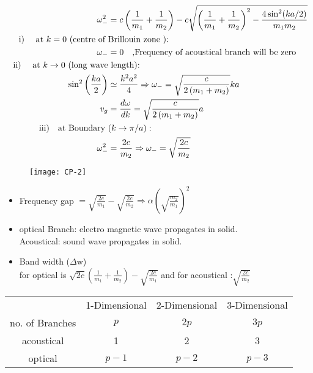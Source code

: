 \begin{align*}
\omega_{-}^{2}&=c\left(\frac{1}{m_{1}}+\frac{1}{m_{2}}\right)-c \sqrt{\left(\frac{1}{m_{1}}+\frac{1}{m_{2}}\right)^{2}-\frac{4 \sin ^{2}(k a / 2)}{m_{1} m_{2}}}\\
\text { i) \quad at } k=0 \text { (centre of }&\text{Brillouin zone}  \text { ): }\\
\omega_{-}&=0 \quad \text{,Frequency of acoustical branch will be zero}\\
\text { ii) \quad at } k \rightarrow 0 \text { (long wave}&\text{ length): }\\
\sin ^{2}\left(\frac{k a}{2}\right) &\simeq \frac{k^{2} a^{2}}{4} \Rightarrow \omega_{-}=\sqrt{\frac{c}{2\left(m_{1}+m_{2}\right)}} k a\\
v_{g}&=\frac{d\omega}{d k}=\sqrt{\frac{c}{2\left(m_{1}+m_{2}\right)}} a\\
\text{iii)\quad at Boundary }&(k \rightarrow \pi / a):\\
\omega_{-}^{2}&=\frac{2 c}{m_{2}} \Rightarrow \omega_{-}=\sqrt{\frac{2 c}{m_{2}}}
\end{align*}
\begin{figure}[H]
	\centering
	\texttt{[image: CP-2]}
\end{figure}
\begin{itemize}
	\item Frequency gap $=\sqrt{\frac{2 c}{m_{1}}}-\sqrt{\frac{2 c}{m_{2}}} \Rightarrow \alpha\left(\sqrt{\frac{m_{2}}{m_{1}}}\right)^{2}$
	\item optical Branch: electro magnetic wave propagates in solid.\\ Acoustical: sound wave propagates in solid.
	\item Band width ($\Delta$w)\\
	for optical is
$	\sqrt{2 c}\left(\frac{1}{m_{1}}+\frac{1}{m_{2}}\right)-\sqrt{\frac{2 c}{m_{1}}}$
	  and for acoustical :$\sqrt{\frac{2 c}{m_{2}}} $
\end{itemize}
\renewcommand*{\arraystretch}{1.5}
\begin{tabular}{|c|c|c|c|} 
	\hline
	& 1-Dimensional & 2-Dimensional& 3-Dimensional \\
	\cline { 2 - 4 } no. of Branches & $p$ & $2 p$ & $3 p$ \\
	\hline acoustical & 1 & 2 & 3 \\
	\hline optical & $p-1$ & $p-2$ & $p-3$\\
	\hline
\end{tabular}
